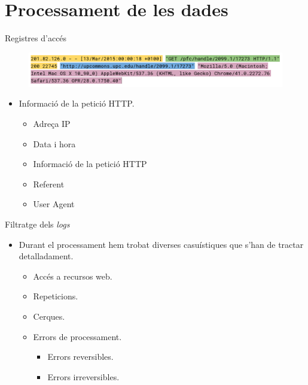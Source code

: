 \section{Processament de les dades}\label{sec:data-processing}

\begin{frame}{Registres d'accés}

\begin{figure}
    \includegraphics[width=\textwidth]{figures/example-log}\label{fig:log-example}
\end{figure}

\begin{itemize}[<+- | alert@+>]
    \item Informació de la petició HTTP.
    \begin{itemize}[<+- | alert@+>]
        \item Adreça IP
        \item Data i hora
        \item Informació de la petició HTTP
        \item Referent
        \item User Agent
    \end{itemize}
\end{itemize}

\end{frame}


\begin{frame}{Filtratge dels \textit{logs}}
    \begin{itemize}[<+- | alert@+>]
        \item Durant el processament hem trobat diverses casuístiques que s'han de tractar detalladament.
        \begin{itemize}[<+- | alert@+>]
            \item Accés a recursos web.
            \item Repeticions.
            \item Cerques.
            \item Errors de processament.
            \begin{itemize}[<+- | alert@+>]
                \item Errors reversibles.
                \item Errors irreversibles.
            \end{itemize}
        \end{itemize}
    \end{itemize}
\end{frame}


